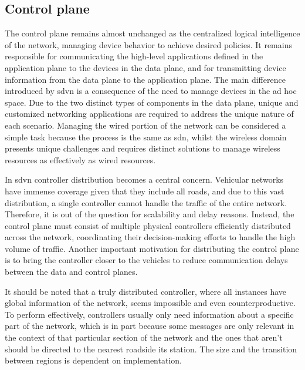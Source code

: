 \subsection{Control plane}
\label{subsec:control_plane}

The control plane remains almost unchanged as the centralized logical intelligence of the network, managing device behavior to achieve desired policies. It remains responsible for communicating the high-level applications defined in the application plane to the devices in the data plane, and for transmitting device information from the data plane to the application plane. The main difference introduced by \gls{sdvn} is a consequence of the need to manage devices in the ad hoc space. Due to the two distinct types of components in the data plane, unique and customized networking applications are required to address the unique nature of each scenario. Managing the wired portion of the network can be considered a simple task because the process is the same as \gls{sdn}, whilst the wireless domain presents unique challenges and requires distinct solutions to manage wireless resources as effectively as wired resources\cite{cardona_software-defined_2020}.

In \gls{sdvn} controller distribution becomes a central concern. Vehicular networks have immense coverage given that they include all roads, and due to this vast distribution, a single controller cannot handle the traffic of the entire network. Therefore, it is out of the question for scalability and delay reasons\cite{toufga_openflow_2018}. Instead, the control plane must consist of multiple physical controllers efficiently distributed across the network, coordinating their decision-making efforts to handle the high volume of traffic\cite{ben_jaballah_security_2020}. Another important motivation for distributing the control plane is to bring the controller closer to the vehicles to reduce communication delays between the data and control planes\cite{nkenyereye_software-defined_2019}. 

It should be noted that a truly distributed controller, where all instances have global information of the network, seems impossible and even counterproductive. To perform effectively, controllers usually only need information about a specific part of the network, which is in part because some messages are only relevant in the context of that particular section of the network\cite{cardona_software-defined_2020} and the ones that aren't should be directed to the nearest roadside \gls{its} station. The size and the transition between regions is dependent on implementation. 

